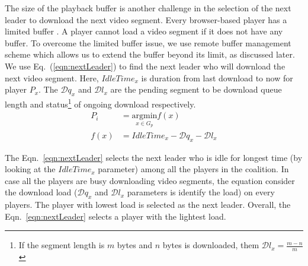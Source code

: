 The size of the playback buffer is another challenge in the selection of the next leader to download the next video segment. Every browser-based player has a limited buffer \cite{sengupta2018hotdash}. A player cannot load a video segment if it does not have any buffer. To overcome the limited buffer issue, we use remote buffer management scheme which allows us to extend the buffer beyond its limit, as discussed later. We use Eq.~(\ref{eqn:nextLeader}) to find the next leader who will download the next video segment. Here, $IdleTime_x$ is duration from last download to now for player $P_x$. The $\mathcal{D}{q_x}$ and $\mathcal{D}{l_x}$ are the pending segment to be download queue length and status\footnote{If the segment length is $m$ bytes and $n$ bytes is downloaded, them  $\mathcal{D}{l_x} = \frac{m-n}{m}$ } of ongoing download  respectively. 
\begin{align}
	P_i &= \underset{x \in G_p}{\mathrm{argmin}} f(x) \nonumber\\
	f(x) &= IdleTime_x - \mathcal{D}{q_x} - \mathcal{D}{l_x}
	\label{eqn:nextLeader}
\end{align}

The Eqn.~\ref{eqn:nextLeader} selects the next leader who is idle for longest time (by looking at the $IdleTime_x$ parameter) among all the players in the coalition. In case all the players are busy downloading video segments, the equation consider the download load ($\mathcal{D}{q_x}$ and $\mathcal{D}{l_x}$ parameters is identify the load) on every players. The player with lowest load is selected as the next leader. Overall, the Eqn.~\ref{eqn:nextLeader} selects a player with the lightest load.


